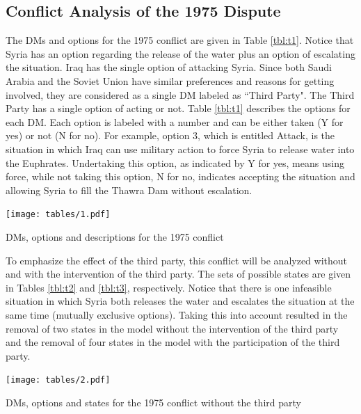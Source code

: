 \documentclass[letterpaper,12pt,titlepage,oneside,final]{book}
\begin{document}

\subsection{Conflict Analysis of the 1975 Dispute}
The DMs and options for the 1975 conflict are given in Table \ref{tbl:t1}. Notice that Syria has an option regarding the release of the water plus an option of escalating the situation. Iraq has the single option of attacking Syria. Since both Saudi Arabia and the Soviet Union have similar preferences and reasons for getting involved, they are considered as a single DM labeled as ``Third Party". The Third Party has a single option of acting or not. Table \ref{tbl:t1} describes the options for each DM. Each option is labeled with a number and can be either taken (Y for yes) or not (N for no). For example, option 3, which is entitled Attack, is the situation in which Iraq can use military action to force Syria to release water into the Euphrates. Undertaking this option, as indicated by Y for yes, means using force, while not taking this option, N for no, indicates accepting the situation and allowing Syria to fill the Thawra Dam without escalation.

\begin{table}[H]
\centering
\texttt{[image: tables/1.pdf]}

\caption{DMs, options and descriptions for the 1975 conflict}

\label{tbl:t1}
\end{table}

To emphasize the effect of the third party, this conflict will be analyzed without and with the intervention of the third party. The sets of possible states are given in Tables \ref{tbl:t2} and \ref{tbl:t3}, respectively. Notice that there is one infeasible situation in which Syria both releases the water and escalates the situation at the same time (mutually exclusive options). Taking this into account resulted in the removal of two states in the model without the intervention of the third party and the removal of four states in the model with the participation of the third party.

\begin{table}[H]
\centering
\texttt{[image: tables/2.pdf]}

\caption{DMs, options and states for the 1975 conflict without the third party}

\label{tbl:t2}
\end{table}
\end{document}
